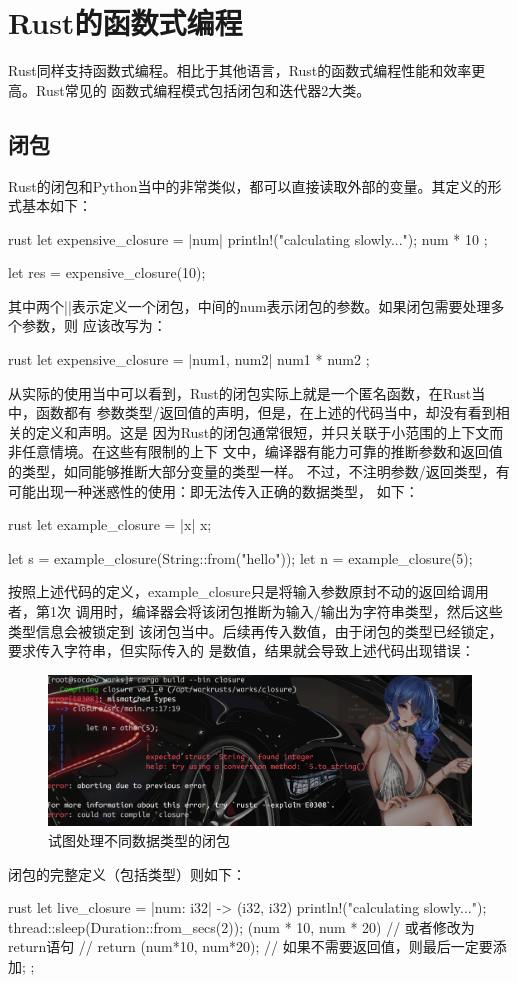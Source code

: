 \section{Rust的函数式编程}
Rust同样支持函数式编程。相比于其他语言，Rust的函数式编程性能和效率更高。Rust常见的
函数式编程模式包括闭包和迭代器2大类。

\subsection{闭包}
Rust的闭包和Python当中的非常类似，都可以直接读取外部的变量。其定义的形式基本如下：
\begin{code-block}{rust}
let expensive_closure = |num| {
    println!("calculating slowly...");
    num * 10
};

let res = expensive_closure(10);
\end{code-block}
其中两个||表示定义一个闭包，中间的num表示闭包的参数。如果闭包需要处理多个参数，则
应该改写为：
\begin{code-block}{rust}
let expensive_closure = |num1, num2| {
    num1 * num2
};
\end{code-block}

从实际的使用当中可以看到，Rust的闭包实际上就是一个匿名函数，在Rust当中，函数都有
参数类型/返回值的声明，但是，在上述的代码当中，却没有看到相关的定义和声明。这是
因为Rust的闭包通常很短，并只关联于小范围的上下文而非任意情境。在这些有限制的上下
文中，编译器有能力可靠的推断参数和返回值的类型，如同能够推断大部分变量的类型一样。
不过，不注明参数/返回类型，有可能出现一种迷惑性的使用：即无法传入正确的数据类型，
如下：
\begin{code-block}{rust}
let example_closure = |x| x;

let s = example_closure(String::from("hello"));
let n = example_closure(5);
\end{code-block}
按照上述代码的定义，example\_closure只是将输入参数原封不动的返回给调用者，第1次
调用时，编译器会将该闭包推断为输入/输出为字符串类型，然后这些类型信息会被锁定到
该闭包当中。后续再传入数值，由于闭包的类型已经锁定，要求传入字符串，但实际传入的
是数值，结果就会导致上述代码出现错误：
\begin{figure}[H]
  \centering
  \includegraphics[width=\linewidth]{rust_closure_diffrent_type.png}
  \caption{试图处理不同数据类型的闭包}
  \label{fig:rust_closure_diffrent}
\end{figure}

闭包的完整定义（包括类型）则如下：
\begin{code-block}{rust}
let live_closure = |num: i32| -> (i32, i32) {
    println!("calculating slowly...");
    thread::sleep(Duration::from_secs(2));
    (num * 10, num * 20)
    // 或者修改为return语句
    // return (num*10, num*20);
    // 如果不需要返回值，则最后一定要添加;
};
\end{code-block}
